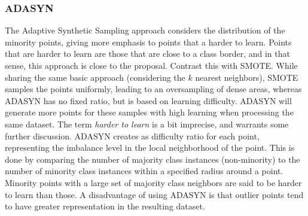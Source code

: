 \documentclass[letterpaper]{report}
\begin{document}
\subsubsection{ADASYN}
\label{section:adasyn}
The Adaptive Synthetic Sampling approach considers the distribution of the minority points, giving more emphasis to points that a harder to learn. \cite{He2008-xr} Points that are harder to learn are those that are close to a class border, and in that sense, this approach is close to the  proposal. Contrast this with SMOTE. While sharing the same basic approach (considering the $k$ nearest neighbors), SMOTE samples the points uniformly, leading to an oversampling of dense areas, whereas ADASYN has no fixed ratio, but is based on learning difficulty. ADASYN will generate more points for these samples with high learning when processing the same dataset. The term \textit{harder to learn} is a bit imprecise, and warrants some further discussion. ADASYN creates as difficulty ratio for each point, representing the imbalance level in the local neighborhood of the point. This is done by comparing the number of majority class instances (non-minority) to the number of minority class instances within a specified radius around a point. Minority points with a large set of majority class neighbors are said to be harder to learn than those. A disadvantage of using ADASYN is that outlier points tend to have greater representation in the resulting dataset.
\end{document}
